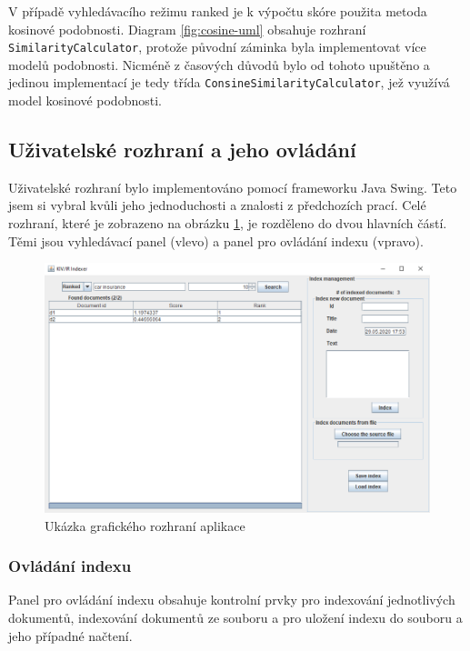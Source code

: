\documentclass[11pt,a4paper]{scrartcl}
\begin{document}
	V případě vyhledávacího režimu ranked je k výpočtu skóre použita metoda kosinové podobnosti. Diagram \ref{fig:cosine-uml} obsahuje rozhraní \verb|SimilarityCalculator|, protože původní záminka byla implementovat více modelů podobnosti. Nicméně z časových důvodů bylo od tohoto upuštěno a jedinou implementací je tedy třída \verb|ConsineSimilarityCalculator|, jež využívá model kosinové podobnosti. 
	
	\subsection{Uživatelské rozhraní a jeho ovládání}
	
	Uživatelské rozhraní bylo implementováno pomocí frameworku Java Swing. Teto jsem si vybral kvůli jeho jednoduchosti a znalosti z předchozích prací. Celé rozhraní, které je zobrazeno na obrázku \ref{fig:gui-example}, je rozděleno do dvou hlavních částí. Těmi jsou vyhledávací panel (vlevo) a panel pro ovládání indexu (vpravo).
	
	\begin{figure}[!h]
		\centering
		\includegraphics[width=\linewidth]{gui-ranked}
		\caption{Ukázka grafického rozhraní aplikace}
		\label{fig:gui-example}
	\end{figure}

	\subsubsection{Ovládání indexu}
	
	Panel pro ovládání indexu obsahuje kontrolní prvky pro indexování jednotlivých dokumentů, indexování dokumentů ze souboru a pro uložení indexu do souboru a jeho případné načtení.
	
\end{document}
